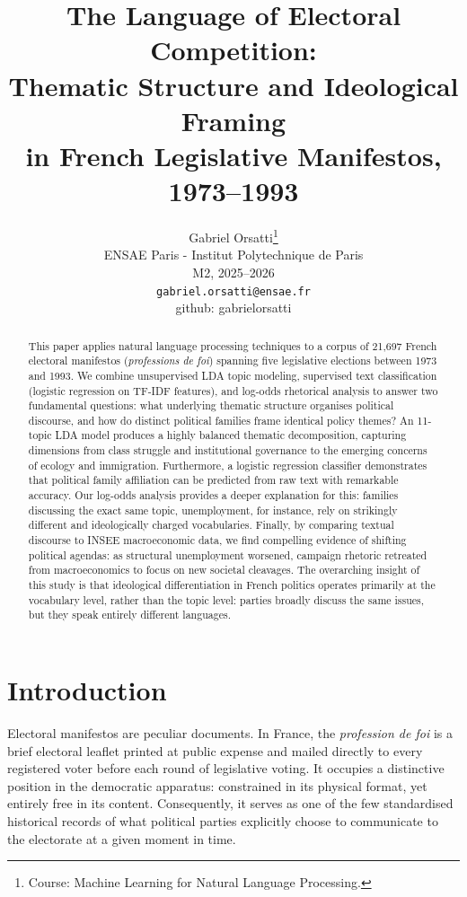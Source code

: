 \documentclass{article}
\title{The Language of Electoral Competition:\\Thematic Structure and Ideological Framing\\in French Legislative Manifestos, 1973--1993}
\author{
  Gabriel Orsatti\thanks{Course: Machine Learning for Natural Language Processing.} \\
  ENSAE Paris - Institut Polytechnique de Paris\\
  M2, 2025--2026\\
  \texttt{gabriel.orsatti@ensae.fr}\\
  github: gabrielorsatti
}
\begin{document}
\maketitle

\begin{abstract}
This paper applies natural language processing techniques to a corpus of 21,697 French electoral manifestos (\textit{professions de foi}) spanning five legislative elections between 1973 and 1993. We combine unsupervised LDA topic modeling, supervised text classification (logistic regression on TF-IDF features), and log-odds rhetorical analysis to answer two fundamental questions: what underlying thematic structure organises political discourse, and how do distinct political families frame identical policy themes? An 11-topic LDA model produces a highly balanced thematic decomposition, capturing dimensions from class struggle and institutional governance to the emerging concerns of ecology and immigration. Furthermore, a logistic regression classifier demonstrates that political family affiliation can be predicted from raw text with remarkable accuracy. Our log-odds analysis provides a deeper explanation for this: families discussing the exact same topic, unemployment, for instance, rely on strikingly different and ideologically charged vocabularies. Finally, by comparing textual discourse to INSEE macroeconomic data, we find compelling evidence of shifting political agendas: as structural unemployment worsened, campaign rhetoric retreated from macroeconomics to focus on new societal cleavages. The overarching insight of this study is that ideological differentiation in French politics operates primarily at the vocabulary level, rather than the topic level: parties broadly discuss the same issues, but they speak entirely different languages.
\end{abstract}

\section{Introduction}

Electoral manifestos are peculiar documents. In France, the \textit{profession de foi} is a brief electoral leaflet printed at public expense and mailed directly to every registered voter before each round of legislative voting. It occupies a distinctive position in the democratic apparatus: constrained in its physical format, yet entirely free in its content. Consequently, it serves as one of the few standardised historical records of what political parties explicitly choose to communicate to the electorate at a given moment in time.
\end{document}
